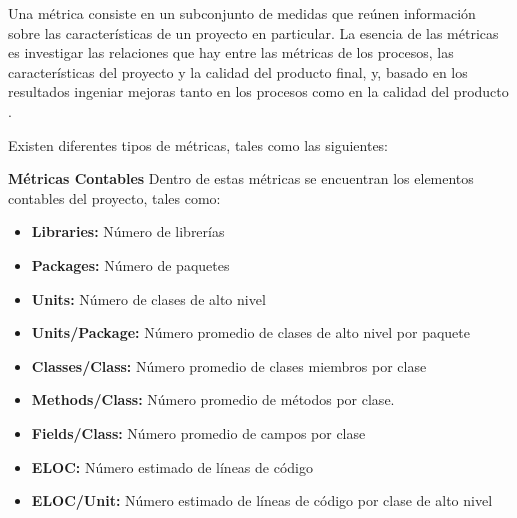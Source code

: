 Una métrica consiste en un subconjunto de medidas que reúnen información sobre las características de un proyecto en particular. La esencia de las métricas es investigar las relaciones que hay entre las métricas de los procesos, las características del proyecto y la calidad del producto final, y, basado en los resultados ingeniar mejoras tanto en los procesos como en la calidad del producto \cite{Stehen_2003}.  

Existen diferentes tipos de métricas, tales como las siguientes:

\textbf{Métricas Contables} Dentro de estas métricas se encuentran los elementos contables del proyecto, tales como:
\begin{itemize}[itemsep=1mm,topsep=0pt,leftmargin=0.6in]
	\item\textbf{Libraries:} Número de librerías
	\item\textbf{Packages:} Número de paquetes
	\item\textbf{Units:} Número de clases de alto nivel
	\item\textbf{Units/Package:} Número promedio de clases de alto nivel por paquete
	\item\textbf{Classes/Class:} Número promedio de clases miembros por clase
	\item\textbf{Methods/Class:} Número promedio de métodos por clase.
	\item\textbf{Fields/Class:} Número promedio de campos por clase
	\item\textbf{ELOC:} Número estimado de líneas de código
	\item\textbf{ELOC/Unit:}  Número estimado de líneas de código por clase de alto nivel
\end{itemize}

